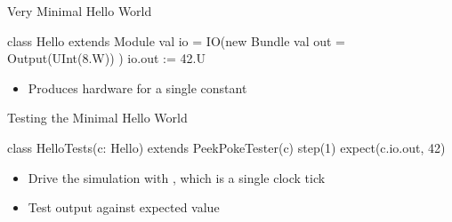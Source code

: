 \begin{frame}[fragile]{Very Minimal Hello World}
\begin{chisel}
class Hello extends Module {
  val io = IO(new Bundle {
    val out = Output(UInt(8.W))
  })
  io.out := 42.U
}
\end{chisel}
\begin{itemize}
\item Produces hardware for a single constant
\end{itemize}
\end{frame}

\begin{frame}[fragile]{Testing the Minimal Hello World}
\begin{chisel}
class HelloTests(c: Hello) extends PeekPokeTester(c) {
  step(1)
  expect(c.io.out, 42)
}
\end{chisel}
\begin{itemize}
\item Drive the simulation with , which is a single clock tick
\item Test output against expected value
\end{itemize}
\end{frame}

%

